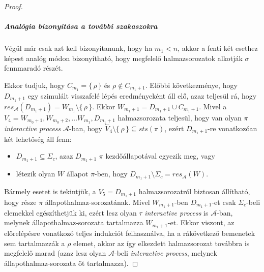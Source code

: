 \documentclass[12pt]{article}
\theoremstyle{definition}
\theoremstyle{remark}
\theoremstyle{plain}
\theoremstyle{remark}
\theoremstyle{plain}
\let\emptyset\varnothing
\newcommand{\backwardhat}{\overset{\leftharpoonup}}
\newcommand{\res}{\textit{res}}
\begin{document}
\begin{proof}
        \subparagraph{Analógia bizonyítása a további szakaszokra}
        Végül már csak azt kell bizonyítanunk, hogy ha $m_{1} < n$, akkor a fenti két esethez képest analóg módon bizonyítható, hogy megfelelő halmazsorozatok alkotják $\sigma$ fennmaradó részét. 

        Ekkor tudjuk, hogy $C_{m_{1}} = \{\,\rho\,\}$ és $\rho \notin C_{m_{1} + 1}$. Előbbi következménye, hogy $D_{m_{1} + 1}$ egy szimulált visszafelé lépés eredményeként áll elő, azaz teljesül rá, hogy $\res_{\mathscr{A}}(D_{m_{1} + 1}) = W_{m_{1}} \setminus \{\,\rho\,\}$. Ekkor $W_{m_{1} + 1} = D_{m_{1} + 1} \cup C_{m_{1} + 1}$. Mivel a $V_{4} = W_{m_{0} + 1}, W_{m_{0} + 2}, \ldots W_{m_{1}}, D_{m_{1} + 1}$ halmazsorozata teljesül, hogy van olyan $\pi$ \textit{interactive process} $\mathscr{A}$-ban, hogy $\backwardhat V_{4} \setminus \{\,\rho\,\} \subseteq \textit{sts}(\pi)$, ezért $D_{m_{1} + 1}$-re vonatkozóan két lehetőség áll fenn:
        \begin{itemize}
            \item
            $D_{m_{1} + 1} \subseteq \Sigma_{c}$, azaz $D_{m_{1} + 1}$ $\pi$ kezdőállapotával egyezik meg, vagy
        
            \item
            létezik olyan $W$ állapot $\pi$-ben, hogy $D_{m_{1} + 1} \setminus \Sigma_{c} = \res_{\mathscr{A}}(W)$.
        \end{itemize}
        Bármely esetet is tekintjük, a $V_{5} = D_{m_{1} + 1}$ halmazsorozatról biztosan állítható, hogy része $\pi$ állapothalmaz-sorozatának. Mivel $W_{m_{1} + 1}$-ben $D_{m_{1} + 1}$-et csak $\Sigma_{c}$-beli elemekkel egészíthetjük ki, ezért lesz olyan $\tau$ \textit{interactive process} is $\mathscr{A}$-ban, melynek állapothalmaz-sorozata tartalmazza $W_{m_{1} + 1}$-et. Ekkor viszont, az előrelépésre vonatkozó teljes indukciót felhasználva, ha a rákövetkező bemenetek sem tartalmazzák a $\rho$ elemet, akkor az így elkezdett halmazsorozat továbbra is megfelelő marad (azaz lesz olyan $\mathscr{A}$-beli \textit{interactive process}, melynek állapothalmaz-sorozata őt tartalmazza).
        

\end{proof}
\end{document}
